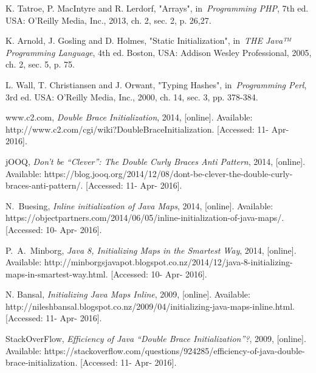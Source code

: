 	\begin{thebibliography}{9}

		K. Tatroe, P. MacIntyre and R. Lerdorf, "Arrays", in~\emph{Programming PHP}, 7th ed. USA: O'Reilly Media, Inc., 2013, ch. 2, sec. 2, p. 26,27. 
			
		K. Arnold, J. Gosling and D. Holmes, "Static Initialization", in~\emph{THE Java™ Programming Language}, 4th ed. Boston, USA: Addison Wesley Professional, 2005, ch. 2, sec. 5, p. 75. 				
		
		L. Wall, T. Christiansen and J. Orwant, "Typing Hashes", in~\emph{Programming Perl}, 3rd ed. USA: O'Reilly Media, Inc., 2000, ch. 14, sec. 3, pp. 378-384. 
			
		www.c2.com, \emph{Double Brace Initialization}, 2014, [online]. Available: http://www.c2.com/cgi/wiki?DoubleBraceInitialization. [Accessed: 11- Apr- 2016].
		
		jOOQ, \emph{Don’t be “Clever”: The Double Curly Braces Anti Pattern}, 2014, [online]. Available: https://blog.jooq.org/2014/12/08/dont-be-clever-the-double-curly-braces-anti-pattern/. [Accessed: 11- Apr- 2016].		
		
		N.~Buesing, \emph{Inline initialization of Java Maps}, 2014, [online]. Available: https://objectpartners.com/2014/06/05/inline-initialization-of-java-maps/. [Accessed: 10- Apr- 2016].		
		
		P.~A.~Minborg, \emph{Java 8, Initializing Maps in the Smartest Way}, 2014, [online]. Available: http://minborgsjavapot.blogspot.co.nz/2014/12/java-8-initializing-maps-in-smartest-way.html. [Accessed: 10- Apr- 2016].
		
		N. Bansal, \emph{Initializing Java Maps Inline}, 2009, [online]. Available: http://nileshbansal.blogspot.co.nz/2009/04/initializing-java-maps-inline.html. [Accessed: 11- Apr- 2016].		
	
		StackOverFlow, \emph{Efficiency of Java “Double Brace Initialization”?}, 2009, [online]. Available: https://stackoverflow.com/questions/924285/efficiency-of-java-double-brace-initialization. [Accessed: 11- Apr- 2016].
			
	\end{thebibliography}
	
